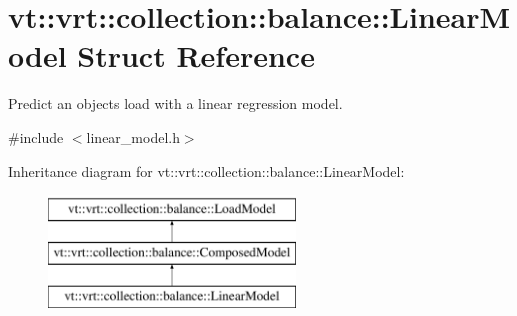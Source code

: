 \hypertarget{structvt_1_1vrt_1_1collection_1_1balance_1_1_linear_model}{}\section{vt\+:\+:vrt\+:\+:collection\+:\+:balance\+:\+:Linear\+Model Struct Reference}
\label{structvt_1_1vrt_1_1collection_1_1balance_1_1_linear_model}


Predict an object\textquotesingle{}s load with a linear regression model.  




{\ttfamily \#include $<$linear\+\_\+model.\+h$>$}

Inheritance diagram for vt\+:\+:vrt\+:\+:collection\+:\+:balance\+:\+:Linear\+Model\+:\begin{figure}[H]
\begin{center}
\leavevmode
\includegraphics[height=3.000000cm]{structvt_1_1vrt_1_1collection_1_1balance_1_1_linear_model}
\end{center}
\end{figure}
